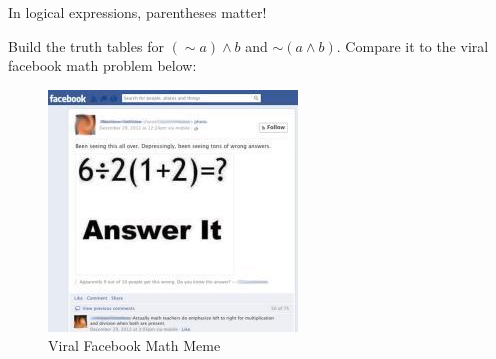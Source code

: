 In logical expressions, parentheses matter!

Build the truth tables for $(\sim a) \land b$ and $\sim (a \land b)$. Compare it to the viral facebook math problem below:

\begin{figure}[ht]
    \centering
    \includegraphics{Ch1/arithmetic.jpg}
    \caption{Viral Facebook Math Meme}
    \label{fig:arithmetic}
\end{figure}